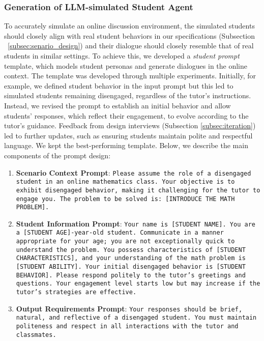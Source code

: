 \subsubsection{Generation of LLM-simulated Student Agent}
To accurately simulate an online discussion environment, the simulated students should closely align with real student behaviors in our specifications (Subsection ~\ref{subsec:senario_design}) and their dialogue should closely resemble that of real students in similar settings. To achieve this, we developed a \textit{student prompt} template, which models student personas and generate dialogues in the online context. The template was developed through multiple experiments. Initially, for example, we defined student behavior in the input prompt but this led to simulated students remaining disengaged, regardless of the tutor's instructions. Instead, we revised the prompt to establish an initial behavior and allow students' responses, which reflect their engagement, to evolve according to the tutor's guidance. Feedback from design interviews (Subsection \ref{subsec:iteration}) led to further updates, such as ensuring students maintain polite and respectful language. We kept the best-performing template. Below, we describe the main components of the prompt design:
\begin{enumerate}
    \item \textbf{Scenario Context Prompt}: \texttt{Please assume the role of a disengaged student in an online mathematics class. Your objective is to exhibit disengaged behavior, making it challenging for the tutor to engage you. The problem to be solved is: [INTRODUCE THE MATH PROBLEM].}
    \item \textbf{Student Information Prompt}: \texttt{Your name is [STUDENT NAME]. You are a [STUDENT AGE]-year-old student. Communicate in a manner appropriate for your age; you are not exceptionally quick to understand the problem. You possess characteristics of [STUDENT CHARACTERISTICS], and your understanding of the math problem is [STUDENT ABILITY]. Your initial disengaged behavior is [STUDENT BEHAVIOR]. Please respond politely to the tutor's greetings and questions. Your engagement level starts low but may increase if the tutor's strategies are effective.}
    \item \textbf{Output Requirements Prompt}: \texttt{Your responses should be brief, natural, and reflective of a disengaged student. You must maintain politeness and respect in all interactions with the tutor and classmates.}
\end{enumerate}


